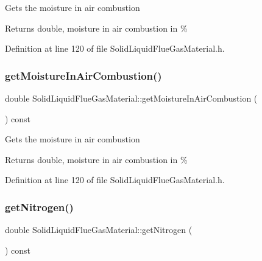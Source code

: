 Gets the moisture in air combustion \begin{DoxyReturn}{Returns}
double, moisture in air combustion in \% 
\end{DoxyReturn}


Definition at line 120 of file Solid\+Liquid\+Flue\+Gas\+Material.\+h.

\mbox{\label{class_solid_liquid_flue_gas_material_ae3d9780851b8217ed2885753f11ec18b}} 
\subsubsection{\texorpdfstring{get\+Moisture\+In\+Air\+Combustion()}{getMoistureInAirCombustion()}\hspace{0.1cm}{\footnotesize\ttfamily [3/3]}}
{\footnotesize\ttfamily double Solid\+Liquid\+Flue\+Gas\+Material\+::get\+Moisture\+In\+Air\+Combustion (\begin{DoxyParamCaption}{ }\end{DoxyParamCaption}) const\hspace{0.3cm}{\ttfamily [inline]}}

Gets the moisture in air combustion \begin{DoxyReturn}{Returns}
double, moisture in air combustion in \% 
\end{DoxyReturn}


Definition at line 120 of file Solid\+Liquid\+Flue\+Gas\+Material.\+h.

\mbox{\label{class_solid_liquid_flue_gas_material_a76159a5d9d609f0e0131f7bca3b60ebc}} 
\subsubsection{\texorpdfstring{get\+Nitrogen()}{getNitrogen()}\hspace{0.1cm}{\footnotesize\ttfamily [1/3]}}
{\footnotesize\ttfamily double Solid\+Liquid\+Flue\+Gas\+Material\+::get\+Nitrogen (\begin{DoxyParamCaption}{ }\end{DoxyParamCaption}) const\hspace{0.3cm}{\ttfamily [inline]}}

